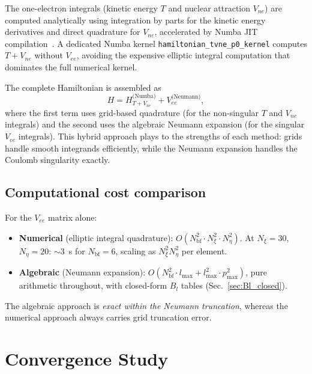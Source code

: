 \documentclass[aps,pra,twocolumn,superscriptaddress,longbibliography]{revtex4-2}
\begin{document}
The one-electron integrals (kinetic energy $T$ and nuclear
attraction $V_{ne}$) are computed analytically using integration
by parts for the kinetic energy derivatives and direct quadrature
for $V_{ne}$, accelerated by Numba JIT
compilation~\cite{Numba2015}.  A dedicated Numba kernel
\texttt{hamiltonian\_tvne\_p0\_kernel} computes $T + V_{ne}$
without $V_{ee}$, avoiding the expensive elliptic integral
computation that dominates the full numerical kernel.

The complete Hamiltonian is assembled as
\begin{equation}
  H = H_{T+V_{ne}}^{\text{(Numba)}} + V_{ee}^{\text{(Neumann)}},
  \label{eq:hybrid_H}
\end{equation}
where the first term uses grid-based quadrature (for the
non-singular $T$ and $V_{ne}$ integrals) and the second
uses the algebraic Neumann expansion (for the singular
$V_{ee}$ integrals).  This hybrid approach plays to the
strengths of each method: grids handle smooth integrands
efficiently, while the Neumann expansion handles the
Coulomb singularity exactly.

\subsection{Computational cost comparison}

For the $V_{ee}$ matrix alone:
\begin{itemize}
  \item \textbf{Numerical} (elliptic integral quadrature):
    $O(N_{\mathrm{bf}}^2 \cdot N_\xi^2 \cdot N_\eta^2)$.
    At $N_\xi = 30$, $N_\eta = 20$: $\sim$3~s for
    $N_{\mathrm{bf}} = 6$, scaling as $N_\xi^2 N_\eta^2$
    per element.
  \item \textbf{Algebraic} (Neumann expansion):
    $O(N_{\mathrm{bf}}^2 \cdot l_{\max} + l_{\max}^2
    \cdot p_{\max}^2)$, pure arithmetic throughout, with
    closed-form $B_l$ tables (Sec.~\ref{sec:Bl_closed}).
\end{itemize}

The algebraic approach is \emph{exact within the Neumann
truncation}, whereas the numerical approach always carries grid
truncation error.


\section{Convergence Study}
\label{sec:convergence}
\end{document}
